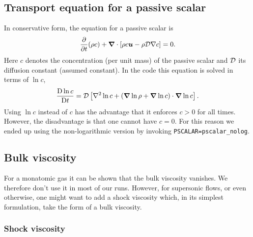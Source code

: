 \documentclass[\mydriver,12pt,twoside,notitlepage,a4paper]{article}
\newcommand{\code}[1]{\texttt{#1}}
\newcommand{\De}      {\mathrm{D}}
\renewcommand{\vec}[1]{\mbox{\boldmath{$#1$}}}
\newcommand{\grad}    {\vec{\nabla}}
\newcommand{\Div}     {\vec{\nabla}\cdot}
\newcommand{\Laplace} {\nabla^2}
\newcommand{\uv}            {\vec{u}}
\begin{document}

\subsection{Transport equation for a passive scalar}

In conservative form, the equation for a passive scalar is
\begin{equation}
{\partial\over\partial t}(\rho c)+
\Div\left[\rho c\uv-\rho{\cal D}\nabla c\right]=0.
\end{equation}
Here $c$ denotes the concentration (per unit mass) of the passive scalar and
${\cal D}$ its diffusion constant (assumed constant).
In the code this equation is solved in terms of $\ln c$,
\begin{equation}
  \frac{\De\ln c}{\De t}
  = {\cal D} \left[ \Laplace\ln c + (\grad\ln\rho+\grad\ln c)\cdot\grad\ln c
               \right].
\end{equation}
Using $\ln c$ instead of $c$ has the advantage that it enforces $c>0$ for all
times.
However, the disadvantage is that one cannot have $c=0$.
For this reason we ended up using the non-logarithmic version by
invoking \code{PSCALAR=pscalar_nolog}.


\subsection{Bulk viscosity}
\label{Bulkviscosity}

For a monatomic gas it can be shown that the bulk viscosity vanishes.
We therefore don't use it in most of our runs.
However, for supersonic flows, or even otherwise, one might want to add a
shock viscosity which, in its simplest formulation, take the form of a
bulk viscosity.

\subsubsection{Shock viscosity}
\label{ShockViscosity}
\end{document}
